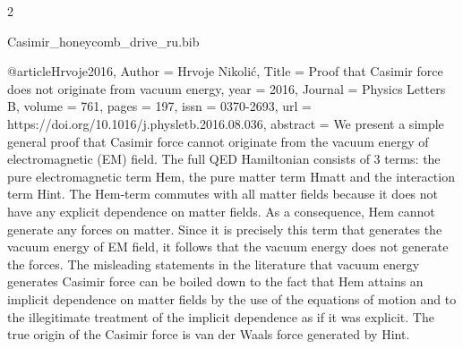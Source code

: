\documentclass[twoside, 10pt]{article}
\def\myfilename{Casimir_honeycomb_drive_ru}
\begin{document}
\begin{multicols}{2}
\begin{filecontents}{\myfilename.bib}

@article{Hrvoje2016,
    Author = {Hrvoje Nikolić},
    Title = {Proof that Casimir force does not originate from vacuum energy},
    year = {2016},
    Journal = {Physics Letters B},
    volume = {761},
    pages = {197},
    issn = {0370-2693},
    url = {https://doi.org/10.1016/j.physletb.2016.08.036},
    abstract = {We present a simple general proof that Casimir force cannot originate from the vacuum energy of electromagnetic (EM) field. The full QED Hamiltonian consists of 3 terms: the pure electromagnetic term Hem, the pure matter term Hmatt and the interaction term Hint. The Hem-term commutes with all matter fields because it does not have any explicit dependence on matter fields. As a consequence, Hem cannot generate any forces on matter. Since it is precisely this term that generates the vacuum energy of EM field, it follows that the vacuum energy does not generate the forces. The misleading statements in the literature that vacuum energy generates Casimir force can be boiled down to the fact that Hem attains an implicit dependence on matter fields by the use of the equations of motion and to the illegitimate treatment of the implicit dependence as if it was explicit. The true origin of the Casimir force is van der Waals force generated by Hint.}
}





\end{filecontents}
\end{multicols}
\end{document}

